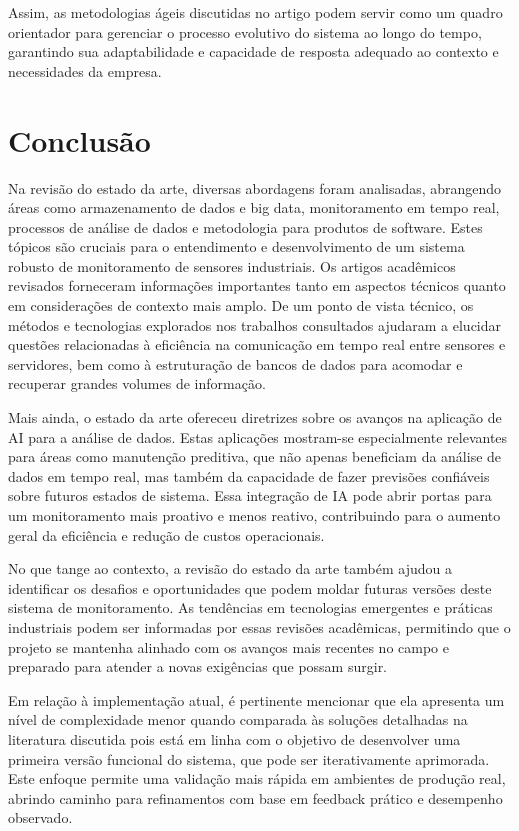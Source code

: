 Assim, as metodologias ágeis discutidas no artigo podem servir como um quadro orientador para gerenciar o processo evolutivo do sistema ao longo do tempo, garantindo sua adaptabilidade e capacidade de resposta adequado ao contexto e necessidades da empresa.


\section{Conclusão}
Na revisão do estado da arte, diversas abordagens foram analisadas, abrangendo áreas como armazenamento de dados e big data, monitoramento em tempo real, processos de análise de dados e metodologia para produtos de software. Estes tópicos são cruciais para o entendimento e desenvolvimento de um sistema robusto de monitoramento de sensores industriais. Os artigos acadêmicos revisados forneceram informações importantes tanto em aspectos técnicos quanto em considerações de contexto mais amplo. De um ponto de vista técnico, os métodos e tecnologias explorados nos trabalhos consultados ajudaram a elucidar questões relacionadas à eficiência na comunicação em tempo real entre sensores e servidores, bem como à estruturação de bancos de dados para acomodar e recuperar grandes volumes de informação.

Mais ainda, o estado da arte ofereceu diretrizes sobre os avanços na aplicação de \gls{AI} para a análise de dados. Estas aplicações mostram-se especialmente relevantes para áreas como manutenção preditiva, que não apenas beneficiam da análise de dados em tempo real, mas também da capacidade de fazer previsões confiáveis sobre futuros estados de sistema. Essa integração de IA pode abrir portas para um monitoramento mais proativo e menos reativo, contribuindo para o aumento geral da eficiência e redução de custos operacionais.

No que tange ao contexto, a revisão do estado da arte também ajudou a identificar os desafios e oportunidades que podem moldar futuras versões deste sistema de monitoramento. As tendências em tecnologias emergentes e práticas industriais podem ser informadas por essas revisões acadêmicas, permitindo que o projeto se mantenha alinhado com os avanços mais recentes no campo e preparado para atender a novas exigências que possam surgir.

Em relação à implementação atual, é pertinente mencionar que ela apresenta um nível de complexidade menor quando comparada às soluções detalhadas na literatura discutida pois está em linha com o objetivo de desenvolver uma primeira versão funcional do sistema, que pode ser iterativamente aprimorada. Este enfoque permite uma validação mais rápida em ambientes de produção real, abrindo caminho para refinamentos com base em feedback prático e desempenho observado.


